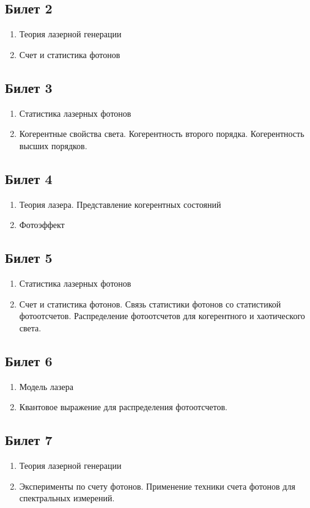 \subsection*{Билет 2} 
\begin{enumerate}
\item Теория лазерной генерации
\item Счет и статистика фотонов
\end{enumerate}

\subsection*{Билет 3} 
\begin{enumerate}
\item Статистика лазерных фотонов
\item Когерентные свойства света.
 Когерентность второго порядка.
 Когерентность высших порядков.
\end{enumerate}

\subsection*{Билет 4} 
\begin{enumerate}
\item Теория лазера. Представление когерентных состояний
\item Фотоэффект
\end{enumerate}

\subsection*{Билет 5} 
\begin{enumerate}
\item Статистика лазерных фотонов
\item Счет и статистика фотонов.
Связь статистики фотонов со статистикой фотоотсчетов.
Распределение фотоотсчетов для когерентного и хаотического
  света.
\end{enumerate}

\subsection*{Билет 6} 
\begin{enumerate}
\item Модель лазера
\item Квантовое выражение для распределения фотоотсчетов.
\end{enumerate}

\subsection*{Билет 7} 
\begin{enumerate}
\item Теория лазерной генерации
\item Эксперименты по счету фотонов. Применение техники счета
  фотонов для спектральных измерений.
\end{enumerate}


